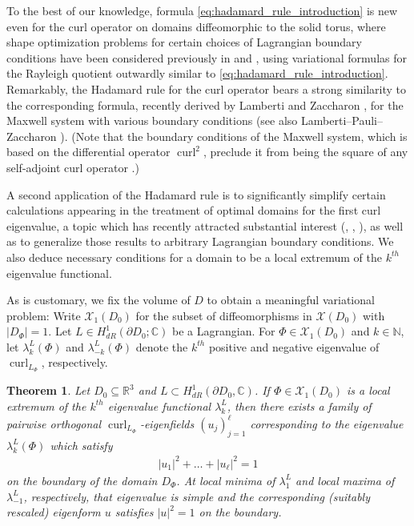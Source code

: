 \documentclass[11pt,reqno]{amsart}
\newtheorem{theorem}{Theorem}[section]
\DeclareMathOperator{\curl}{curl}
\begin{document}
To the best of our knowledge, formula \eqref{eq:hadamard_rule_introduction} is new even for the curl operator on domains diffeomorphic to the solid torus, where shape optimization problems for certain choices of Lagrangian boundary conditions have been considered previously in \cite{CantarellaDeTurckGluckTeytelA} and \cite{EncisoPeralta2020}, using variational formulas for the Rayleigh quotient outwardly similar to \eqref{eq:hadamard_rule_introduction}. Remarkably, the Hadamard rule for the curl operator bears a strong similarity to the corresponding formula, recently derived by Lamberti and Zaccharon \cite{LambertiZaccaron}, for the Maxwell system with various boundary conditions (see also Lamberti--Pauli--Zaccharon \cite{LambertiPauliZaccaron}). (Note that the boundary conditions of the Maxwell system, which is based on the differential operator $\curl^2$, preclude it from being the square of any self-adjoint curl operator \cite[Section 8]{HiptmairKotiugaTordeux2012}.)

A second application of the Hadamard rule is to significantly simplify certain calculations appearing in the treatment of optimal domains for the first curl eigenvalue, a topic which has recently attracted substantial interest (\cite{EncisoPeralta2020}, \cite{Gerner2023}, \cite{EncisoGernerPeralta2024}), as well as to generalize those results to arbitrary Lagrangian boundary conditions. We also deduce necessary conditions for a domain to be a local extremum of the $k^{th}$ eigenvalue functional.

As is customary, we fix the volume of $D$ to obtain a meaningful variational problem: Write $\mathcal X_1(D_0)$ for the subset of diffeomorphisms in $\mathcal X(D_0)$ with $|D_\Phi| = 1$. Let $L\in H^1_{dR} (\partial D_0;\mathbb C)$ be a Lagrangian. For $\Phi \in \mathcal X_1(D_0)$ and $k \in \mathbb N$, let $\lambda_k^L(\Phi)$ and $\lambda_{-k}^L(\Phi)$ denote the $k^{th}$ positive and negative eigenvalue of $\curl_{L_\Phi}$, respectively.

\begin{theorem}
    \label{thm:extremal_eigenvalues}
    Let $D_0 \subseteq \mathbb R^3$ and $L \subset H^1_{dR}(\partial D_0,\mathbb C)$.
     If $\Phi \in \mathcal X_1(D_0)$ is a local extremum of the $k^{th}$ eigenvalue functional $\lambda_k^L$, then there exists a family of pairwise orthogonal $\curl_{L_\Phi}$-eigenfields $(u_j)_{j=1}^\ell$ corresponding to the eigenvalue $\lambda_k^L(\Phi)$ which satisfy
    \begin{align*}
        |u_1|^2 + \ldots + |u_\ell|^2 = 1
    \end{align*}
    on the boundary of the domain $D_{\Phi}$. At local minima of $\lambda_1^L$ and local maxima of $\lambda_{-1}^L$, respectively, that eigenvalue is simple and the corresponding (suitably rescaled) eigenform $u$ satisfies $|u|^2 = 1$ on the boundary.
\end{theorem}
\end{document}

